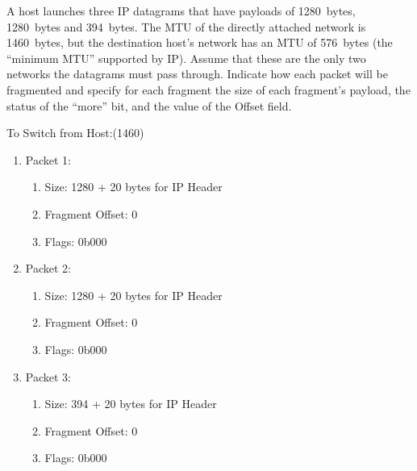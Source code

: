 \documentclass[12pt,addpoints,answers]{exam}
\begin{document}
\begin{questions}
\question[12] A host launches three IP datagrams that have payloads of \SI{1280}{bytes}, \SI{1280}{bytes} and \SI{394}{bytes}. The MTU of the directly attached network is \SI{1460}{bytes}, but the destination host's network has an MTU of \SI{576}{bytes} (the ``minimum MTU'' supported by IP). Assume that these are the only two networks the datagrams must pass through. Indicate how each packet will be fragmented and specify for each fragment the size of each fragment's payload, the status of the ``more'' bit, and the value of the Offset field.
\begin{solution}[3in]
	To Switch from Host:(1460)
	\begin{enumerate}	
		\item Packet 1: 
		\begin{enumerate}
			\item Size: 1280 + 20 bytes for IP Header
			\item Fragment Offset: 0
			\item Flags: 0b000
		\end{enumerate}
		\item Packet 2: 
		\begin{enumerate}
			\item Size: 1280 + 20 bytes for IP Header
			\item Fragment Offset: 0
			\item Flags: 0b000
		\end{enumerate}
		\item Packet 3:
		\begin{enumerate}
			\item Size: 394 + 20 bytes for IP Header
			\item Fragment Offset: 0
			\item Flags: 0b000
		\end{enumerate}
	\end{enumerate}
	

\end{solution}
\end{questions}
\end{document}
